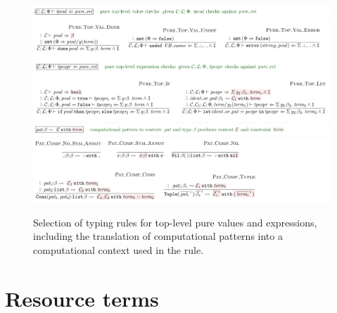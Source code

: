 \begin{figure}[tp]
    \includegraphics{figures/kernel-tpval-typing}
    \includegraphics{figures/kernel-tpexpr-typing}
    \includegraphics{figures/kernel-pat-comp-typing-1}
    \includegraphics{figures/kernel-pat-comp-typing-2}
    \caption{Selection of  typing rules for top-level pure values and
        expressions, including the translation of computational patterns into a
        computational context used in the  rule.}\label{fig:typing-tpval-tpexpr}
\end{figure}

\section{Resource terms}\label{sec:typing-res-terms}

